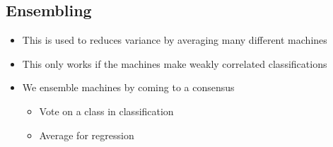 \documentclass[11pt]{article}
\begin{document}
\subsection{Ensembling}
\label{sec:orge81e15e}
\begin{itemize}
\item This is used to reduces variance by averaging many different machines
\item This only works if the machines make weakly correlated classifications
\item We ensemble machines by coming to a consensus
\begin{itemize}
\item Vote on a class in classification
\item Average for regression
\end{itemize}
\end{itemize}
\end{document}
